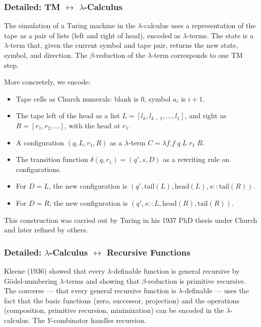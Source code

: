 \subsubsection*{Detailed: TM $\leftrightarrow$ $\lambda$-Calculus}

The simulation of a Turing machine in the $\lambda$-calculus uses a representation of the tape as a pair of lists (left and right of head), encoded as $\lambda$-terms. The state is a $\lambda$-term that, given the current symbol and tape pair, returns the new state, symbol, and direction. The $\beta$-reduction of the $\lambda$-term corresponds to one TM step.

More concretely, we encode:
\begin{itemize}
\item Tape cells as Church numerals: blank is $0$, symbol $a_i$ is $i+1$.
\item The tape left of the head as a list $L = [l_k, l_{k-1}, \ldots, l_1]$, and right as $R = [r_1, r_2, \ldots]$, with the head at $r_1$.
\item A configuration $(q, L, r_1, R)$ as a $\lambda$-term $C = \lambda f. f\; q\; L\; r_1\; R$.
\item The transition function $\delta(q, r_1) = (q', s, D)$ as a rewriting rule on configurations.
\item For $D = L$, the new configuration is $(q', \text{tail}(L), \text{head}(L), s::\text{tail}(R))$.
\item For $D = R$, the new configuration is $(q', s::L, \text{head}(R), \text{tail}(R))$.
\end{itemize}

This construction was carried out by Turing in his 1937 PhD thesis under Church and later refined by others.

\subsubsection*{Detailed: $\lambda$-Calculus $\leftrightarrow$ Recursive Functions}

Kleene (1936) showed that every $\lambda$-definable function is general recursive by G\"odel-numbering $\lambda$-terms and showing that $\beta$-reduction is primitive recursive. The converse --- that every general recursive function is $\lambda$-definable --- uses the fact that the basic functions (zero, successor, projection) and the operations (composition, primitive recursion, minimization) can be encoded in the $\lambda$-calculus. The $Y$-combinator handles recursion.

